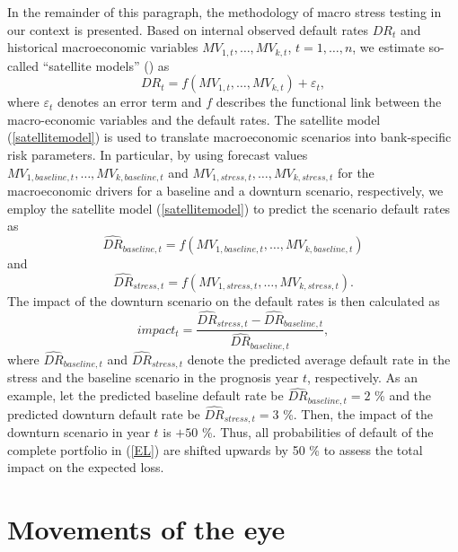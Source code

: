 \documentclass[a4paper, 11pt]{scrreprt}
\begin{document}
In the remainder of this paragraph, the methodology of macro stress testing in our context is presented.
Based on internal observed default rates $DR_t$ and historical macroeconomic variables $MV_{1,t}, \ldots, MV_{k,t}$, $t=1,\ldots,n$, we estimate so-called ``satellite models'' (\textcite[p. 17]{ecb2018srep}) as
\begin{equation}\label{satellitemodel}
DR_t = f(MV_{1,t}, \ldots, MV_{k,t}) + \varepsilon_t,
\end{equation}
where $\varepsilon_t$ denotes an error term and $f$ describes the functional link between the macro-economic variables and the default rates.
The satellite model (\ref{satellitemodel}) is used to translate macroeconomic scenarios into bank-specific risk parameters.
In particular, by using forecast values $MV_{1, baseline,t}, \ldots, MV_{k, baseline,t}$ and $MV_{1, stress,t}, \ldots, MV_{k, stress,t}$ for the macroeconomic drivers for a baseline and a downturn scenario, respectively, we employ the satellite model (\ref{satellitemodel}) to predict the scenario default rates as
\begin{equation}\label{satellitemodel_forecast_baseline}
\widehat{DR}_{baseline,t} = f(MV_{1, baseline,t}, \ldots, MV_{k, baseline,t})
\end{equation}
and
\begin{equation}\label{satellitemodel_forecast_stress}
\widehat{DR}_{stress,t} = f(MV_{1, stress,t}, \ldots, MV_{k, stress,t}).
\end{equation}
The impact of the downturn scenario on the default rates is then calculated as
\begin{equation}\label{stressimpact}
impact_t = \frac{\widehat{DR}_{stress,t} - \widehat{DR}_{baseline,t}}{\widehat{DR}_{baseline,t}},
\end{equation}
where $\widehat{DR}_{baseline,t}$ and $\widehat{DR}_{stress,t}$ denote the predicted average default rate in the stress and the baseline scenario in the prognosis year $t$, respectively. As an example, let the predicted baseline default rate be $\widehat{DR}_{baseline,t} = 2$ \% and the predicted downturn default rate be $\widehat{DR}_{stress,t} = 3$ \%. Then, the impact of the downturn scenario in year $t$ is $+50$ \%. Thus, all probabilities of default of the complete portfolio in (\ref{EL}) are shifted upwards by 50 \% to assess the total impact on the expected loss.




\section{Movements of the eye}
\end{document}
